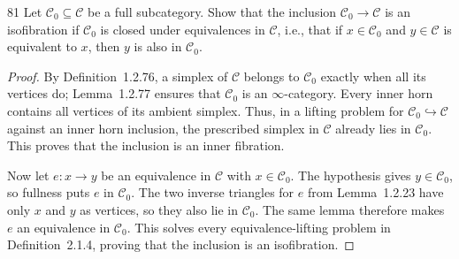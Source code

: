 \begin{exercise}{81}
Let $\mathcal C_0\subseteq\mathcal C$ be a full subcategory. Show that the inclusion
$\mathcal C_0\to\mathcal C$ is an isofibration if $\mathcal C_0$ is closed under
equivalences in $\mathcal C$, i.e., that if $x\in\mathcal C_0$ and $y\in\mathcal C$
is equivalent to $x$, then $y$ is also in $\mathcal C_0$.

\begin{proof}
By Definition~1.2.76, a simplex of $\mathcal C$ belongs to
$\mathcal C_0$ exactly when all its vertices do;
Lemma~1.2.77 ensures that $\mathcal C_0$ is an $\infty$-category.
Every inner horn contains all vertices of its ambient simplex.
Thus, in a lifting problem for $\mathcal C_0\hookrightarrow
\mathcal C$ against an inner horn inclusion, the prescribed
simplex in $\mathcal C$ already lies in $\mathcal C_0$.
This proves that the inclusion is an inner fibration.

Now let $e\colon x\to y$ be an equivalence in $\mathcal C$
with $x\in\mathcal C_0$.
The hypothesis gives $y\in\mathcal C_0$, so fullness puts
$e$ in $\mathcal C_0$.
The two inverse triangles for $e$ from Lemma~1.2.23 have
only $x$ and $y$ as vertices, so they also lie in
$\mathcal C_0$.
The same lemma therefore makes $e$ an equivalence in
$\mathcal C_0$.
This solves every equivalence-lifting problem in
Definition~2.1.4, proving that the inclusion is an isofibration.
\end{proof}
\end{exercise}

